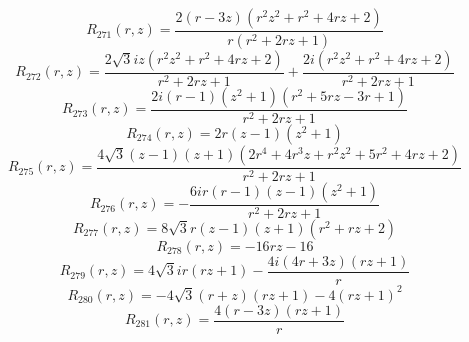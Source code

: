 \documentclass[11pt,a4paper]{article}
\begin{document}
\begin{equation}
R_{271}(r,z)=\frac{2 \left(r - 3 z\right) \left(r^{2} z^{2} + r^{2} + 4 r z + 2\right)}{r \left(r^{2} + 2 r z + 1\right)}
\label{eq:cat-rational-271}
\end{equation}
\begin{equation}
R_{272}(r,z)=\frac{2 \sqrt{3} i z \left(r^{2} z^{2} + r^{2} + 4 r z + 2\right)}{r^{2} + 2 r z + 1} + \frac{2 i \left(r^{2} z^{2} + r^{2} + 4 r z + 2\right)}{r^{2} + 2 r z + 1}
\label{eq:cat-rational-272}
\end{equation}
\begin{equation}
R_{273}(r,z)=\frac{2 i \left(r - 1\right) \left(z^{2} + 1\right) \left(r^{2} + 5 r z - 3 r + 1\right)}{r^{2} + 2 r z + 1}
\label{eq:cat-rational-273}
\end{equation}
\begin{equation}
R_{274}(r,z)=2 r \left(z - 1\right) \left(z^{2} + 1\right)
\label{eq:cat-rational-274}
\end{equation}
\begin{equation}
R_{275}(r,z)=\frac{4 \sqrt{3} \left(z - 1\right) \left(z + 1\right) \left(2 r^{4} + 4 r^{3} z + r^{2} z^{2} + 5 r^{2} + 4 r z + 2\right)}{r^{2} + 2 r z + 1}
\label{eq:cat-rational-275}
\end{equation}
\begin{equation}
R_{276}(r,z)=- \frac{6 i r \left(r - 1\right) \left(z - 1\right) \left(z^{2} + 1\right)}{r^{2} + 2 r z + 1}
\label{eq:cat-rational-276}
\end{equation}
\begin{equation}
R_{277}(r,z)=8 \sqrt{3} r \left(z - 1\right) \left(z + 1\right) \left(r^{2} + r z + 2\right)
\label{eq:cat-rational-277}
\end{equation}
\begin{equation}
R_{278}(r,z)=- 16 r z - 16
\label{eq:cat-rational-278}
\end{equation}
\begin{equation}
R_{279}(r,z)=4 \sqrt{3} i r \left(r z + 1\right) - \frac{4 i \left(4 r + 3 z\right) \left(r z + 1\right)}{r}
\label{eq:cat-rational-279}
\end{equation}
\begin{equation}
R_{280}(r,z)=- 4 \sqrt{3} \left(r + z\right) \left(r z + 1\right) - 4 \left(r z + 1\right)^{2}
\label{eq:cat-rational-280}
\end{equation}
\begin{equation}
R_{281}(r,z)=\frac{4 \left(r - 3 z\right) \left(r z + 1\right)}{r}
\label{eq:cat-rational-281}
\end{equation}
\end{document}

